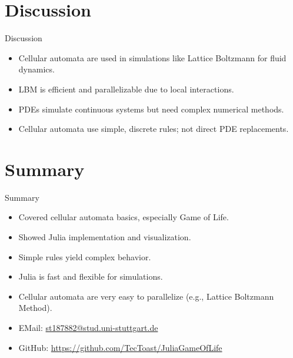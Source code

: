 \section{Discussion}
\begin{frame}{Discussion}
    \begin{itemize}
        \item Cellular automata are used in simulations like Lattice Boltzmann for fluid dynamics.
        \item LBM is efficient and parallelizable due to local interactions.
        \item PDEs simulate continuous systems but need complex numerical methods.
        \item Cellular automata use simple, discrete rules; not direct PDE replacements.
    \end{itemize}

\end{frame}


\section{Summary}
\begin{frame}{Summary}
    \begin{itemize}
        \item Covered cellular automata basics, especially Game of Life.
        \item Showed Julia implementation and visualization.
        \item Simple rules yield complex behavior.
        \item Julia is fast and flexible for simulations.
        \item Cellular automata are very easy to parallelize (e.g., Lattice Boltzmann Method).
              \vspace{1em}
        \item EMail: \url{st187882@stud.uni-stuttgart.de}
        \item GitHub: \url{https://github.com/TecToast/JuliaGameOfLife}
    \end{itemize}
\end{frame}